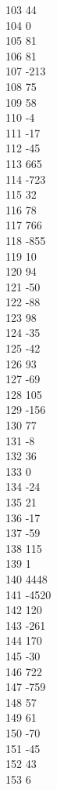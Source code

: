 { 103	44 \\
 104	0 \\
 105	81 \\
 106	81 \\
 107	-213 \\
 108	75 \\
 109	58 \\
 110	-4 \\
 111	-17 \\
 112	-45 \\
 113	665 \\
 114	-723 \\
 115	32 \\
 116	78 \\
 117	766 \\
 118	-855 \\
 119	10 \\
 120	94 \\
 121	-50 \\
 122	-88 \\
 123	98 \\
 124	-35 \\
 125	-42 \\
 126	93 \\
 127	-69 \\
 128	105 \\
 129	-156 \\
 130	77 \\
 131	-8 \\
 132	36 \\
 133	0 \\
 134	-24 \\
 135	21 \\
 136	-17 \\
 137	-59 \\
 138	115 \\
 139	1 \\
 140	4448 \\
 141	-4520 \\
 142	120 \\
 143	-261 \\
 144	170 \\
 145	-30 \\
 146	722 \\
 147	-759 \\
 148	57 \\
 149	61 \\
 150	-70 \\
 151	-45 \\
 152	43 \\
 153	6 \\
}
